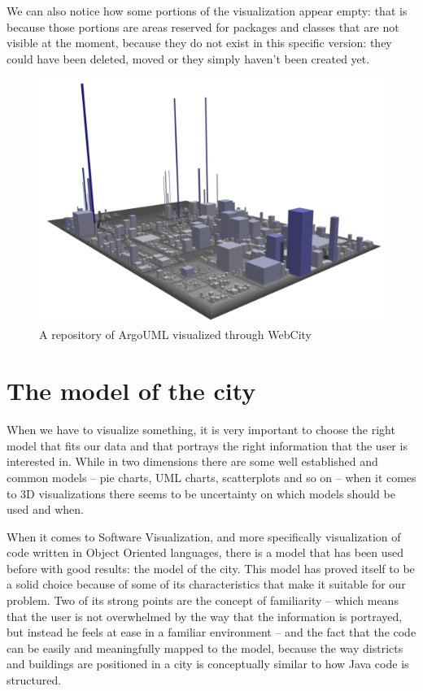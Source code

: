 \documentclass[]{usiinfbachelorproject}
\begin{document}
We can also notice how some portions of the visualization appear empty: that is because those portions are areas reserved for packages and classes that are not visible at the moment, because they do not exist in this specific version: they could have been deleted, moved or they simply haven't been created yet.
\begin{figure} [H]
\centering
\includegraphics[width=.8\textwidth]{pictures/example.png}
\caption{A repository of ArgoUML visualized through WebCity}
\label{fig:example}
\end{figure}


\section{The model of the city} \label{The model of the city}
When we have to visualize something, it is very important to choose the right model that fits our data and that portrays the right information that the user is interested in. While in two dimensions there are some well established and common models -- pie charts, UML charts, scatterplots and so on -- when it comes to 3D visualizations there seems to be uncertainty on which models should be used and when.

When it comes to Software Visualization, and more specifically visualization of code written in Object Oriented languages, there is a model that has been used before \cite{Wett07b} \cite{Wett2008b} \cite{Wett2008a} with good results: the model of the city. This model has proved itself to be a solid choice because of some of its characteristics that make it suitable for our problem. Two of its strong points are the concept of familiarity -- which means that the user is not overwhelmed by the way that the information is portrayed, but instead he feels at ease in a familiar environment -- and the fact that the code can be easily and meaningfully mapped to the model, because the way districts and buildings are positioned in a city is conceptually similar to how Java code is structured.
\end{document}
